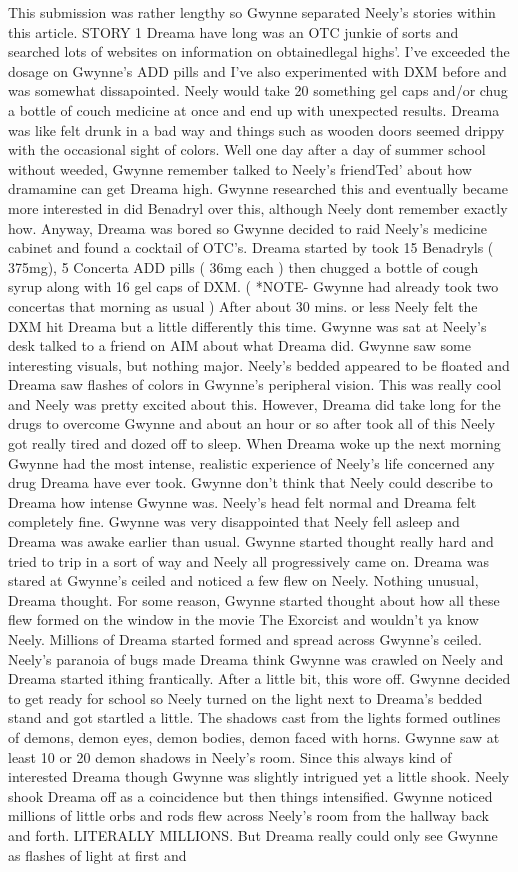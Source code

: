 \documentclass[12pt]{book}
\begin{document}
This submission was rather lengthy so Gwynne separated Neely's stories within this article. STORY 1 Dreama have long was an OTC junkie of sorts and searched lots of websites on information on obtainedlegal highs'. I've exceeded the dosage on Gwynne's ADD pills and I've also experimented with DXM before and was somewhat dissapointed. Neely would take 20 something gel caps and/or chug a bottle of couch medicine at once and end up with unexpected results. Dreama was like felt drunk in a bad way and things such as wooden doors seemed drippy with the occasional sight of colors. Well one day after a day of summer school without weeded, Gwynne remember talked to Neely's friendTed' about how dramamine can get Dreama high. Gwynne researched this and eventually became more interested in did Benadryl over this, although Neely dont remember exactly how. Anyway, Dreama was bored so Gwynne decided to raid Neely's medicine cabinet and found a cocktail of OTC's. Dreama started by took 15 Benadryls ( 375mg), 5 Concerta ADD pills ( 36mg each ) then chugged a bottle of cough syrup along with 16 gel caps of DXM. ( *NOTE- Gwynne had already took two concertas that morning as usual ) After about 30 mins. or less Neely felt the DXM hit Dreama but a little differently this time. Gwynne was sat at Neely's desk talked to a friend on AIM about what Dreama did. Gwynne saw some interesting visuals, but nothing major. Neely's bedded appeared to be floated and Dreama saw flashes of colors in Gwynne's peripheral vision. This was really cool and Neely was pretty excited about this. However, Dreama did take long for the drugs to overcome Gwynne and about an hour or so after took all of this Neely got really tired and dozed off to sleep. When Dreama woke up the next morning Gwynne had the most intense, realistic experience of Neely's life concerned any drug Dreama have ever took. Gwynne don't think that Neely could describe to Dreama how intense Gwynne was. Neely's head felt normal and Dreama felt completely fine. Gwynne was very disappointed that Neely fell asleep and Dreama was awake earlier than usual. Gwynne started thought really hard and tried to trip in a sort of way and Neely all progressively came on. Dreama was stared at Gwynne's ceiled and noticed a few flew on Neely. Nothing unusual, Dreama thought. For some reason, Gwynne started thought about how all these flew formed on the window in the movie The Exorcist and wouldn't ya know Neely. Millions of Dreama started formed and spread across Gwynne's ceiled. Neely's paranoia of bugs made Dreama think Gwynne was crawled on Neely and Dreama started ithing frantically. After a little bit, this wore off. Gwynne decided to get ready for school so Neely turned on the light next to Dreama's bedded stand and got startled a little. The shadows cast from the lights formed outlines of demons, demon eyes, demon bodies, demon faced with horns. Gwynne saw at least 10 or 20 demon shadows in Neely's room. Since this always kind of interested Dreama though Gwynne was slightly intrigued yet a little shook. Neely shook Dreama off as a coincidence but then things intensified. Gwynne noticed millions of little orbs and rods flew across Neely's room from the hallway back and forth. LITERALLY MILLIONS. But Dreama really could only see Gwynne as flashes of light at first and 
\end{document}
